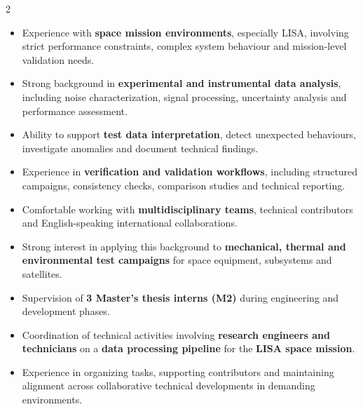 \documentclass[8pt,a4paper,ragged2e,withhyper]{altacv}
\begin{document}
\begin{paracol}{2}

\begin{itemize}
  \item Experience with \textbf{space mission environments}, especially LISA, involving strict performance constraints, complex system behaviour and mission-level validation needs.
  \item Strong background in \textbf{experimental and instrumental data analysis}, including noise characterization, signal processing, uncertainty analysis and performance assessment.
  \item Ability to support \textbf{test data interpretation}, detect unexpected behaviours, investigate anomalies and document technical findings.
  \item Experience in \textbf{verification and validation workflows}, including structured campaigns, consistency checks, comparison studies and technical reporting.
  \item Comfortable working with \textbf{multidisciplinary teams}, technical contributors and English-speaking international collaborations.
  \item Strong interest in applying this background to \textbf{mechanical, thermal and environmental test campaigns} for space equipment, subsystems and satellites.
\end{itemize}


\begin{itemize}
  \item Supervision of \textbf{3 Master's thesis interns (M2)} during engineering and development phases.
  \item Coordination of technical activities involving \textbf{research engineers and technicians} on a \textbf{data processing pipeline} for the \textbf{LISA space mission}.
  \item Experience in organizing tasks, supporting contributors and maintaining alignment across collaborative technical developments in demanding environments.
\end{itemize}


\divider

\divider

\medskip


\divider


\end{paracol}
\end{document}
